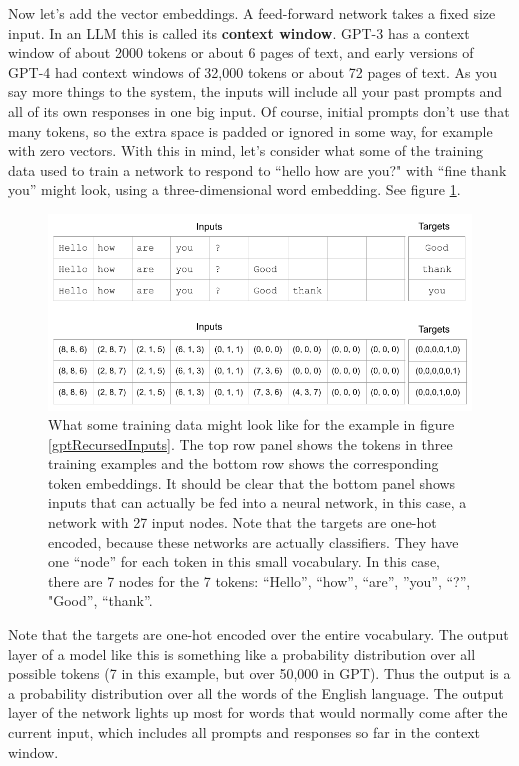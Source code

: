 Now let's add the vector embeddings. A feed-forward network takes a fixed size input.  In an LLM this is called its \textbf{context window}. GPT-3 has a context window of about 2000 tokens or about 6 pages of text, and early versions of GPT-4 had context windows of 32,000 tokens or about 72 pages of text.  As you say more things to the system, the inputs will include all your past prompts and all of its own responses in one big input.  Of course, initial prompts don't use that many tokens, so the extra space is padded or ignored in some way, for example with zero vectors. With this in mind, let's consider what some of the training data used to train a network to respond to ``hello how are you?" with ``fine thank you'' might look, using a three-dimensional word embedding. See figure \ref{contextWindow}. 

\begin{figure}[h]
\centering
\includegraphics[scale=.45]{./images/contextWindow.png}
\caption[Jeff Yoshimi]{What some training data might look like for the example in figure \ref{gptRecursedInputs}. The top row panel shows the tokens in three training examples and the bottom row shows the corresponding token embeddings.  It should be clear that the bottom panel shows inputs that can actually be fed into a neural network, in this case, a network with 27 input nodes. Note that the targets are one-hot encoded, because these networks are actually classifiers. They have one ``node'' for each token in this small vocabulary. In this case, there are 7 nodes for the 7 tokens: ``Hello'', ``how'', ``are'', ''you'', ``?'', "Good'', ``thank''.  }
\label{contextWindow}
\end{figure}

Note that the targets are one-hot encoded over the entire vocabulary. The output layer of a model like this is something like a probability distribution over all possible tokens (7 in this example, but over 50,000 in GPT). Thus the output is a a probability distribution over all the words of the English language. The output layer of the network lights up most for words that would normally come after the current input, which includes all prompts and responses so far in the context window. 

